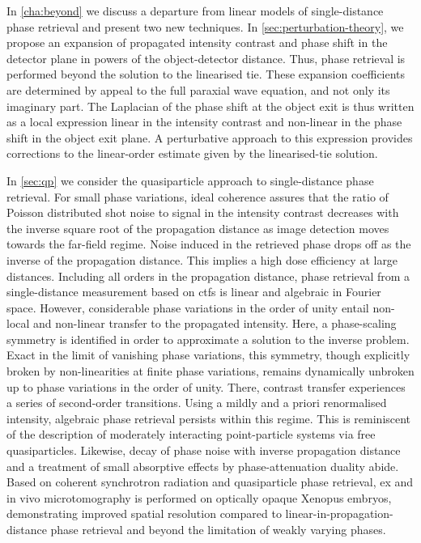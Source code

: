 \documentclass[
twoside,
openright,
titlepage,
numbers=noenddot,
headinclude,
fleqn,
a4paper,
footinclude=true,
cleardoublepage=empty,
abstractoff,
BCOR=5mm,
paper=a4,
fontsize=11pt,
british,ngerman,american,
]{scrreprt}
\begin{document}
In \cref{cha:beyond} we discuss a departure from linear models of
single-distance phase retrieval and present two new techniques.  In
\cref{sec:perturbation-theory}, we propose an expansion of propagated
intensity contrast and phase shift in the detector plane in powers of
the object-detector distance.  Thus, phase retrieval is performed
beyond the solution to the linearised \acf{tie}.  These expansion
coefficients are determined by appeal to the full paraxial wave
equation, and not only its imaginary part.  The Laplacian of the phase
shift at the object exit is thus written as a local expression linear
in the intensity contrast and non-linear in the phase shift in the
object exit plane.  A perturbative approach to this expression
provides corrections to the linear-order estimate  given by the
linearised-\ac{tie} solution.

In \cref{sec:qp} we consider the quasiparticle approach to
single-distance phase retrieval.  For small phase variations, ideal
coherence assures that the ratio of Poisson distributed shot noise to
signal in the intensity contrast decreases with the inverse square
root of the propagation distance as image detection moves towards the
far-field regime.  Noise induced in the retrieved phase drops off as
the inverse of the propagation distance.  This implies a high dose
efficiency at large distances.  Including all orders in the
propagation distance, phase retrieval from a single-distance
measurement based on \aclp{ctf} is linear and algebraic in Fourier
space.  However, considerable phase variations in the order of unity
entail non-local and non-linear transfer to the propagated intensity.
Here, a phase-scaling symmetry is identified in order to approximate a
solution to the inverse problem.  Exact in the limit of vanishing
phase variations, this symmetry, though explicitly broken by
non-linearities at finite phase variations, remains dynamically
unbroken up to phase variations in the order of unity.  There,
contrast transfer experiences a series of second-order transitions.
Using a mildly and a priori renormalised intensity, algebraic phase
retrieval persists within this regime.  This is reminiscent of the
description of moderately interacting point-particle systems via free
quasiparticles.  Likewise, decay of phase noise with inverse
propagation distance and a treatment of small absorptive effects by
phase-attenuation duality abide. %
Based on coherent synchrotron radiation and quasiparticle phase
retrieval, ex and in vivo microtomography is performed on optically
opaque Xenopus embryos, demonstrating improved spatial resolution
compared to linear-in-propagation-distance phase retrieval and beyond
the limitation of weakly varying phases.
\end{document}
